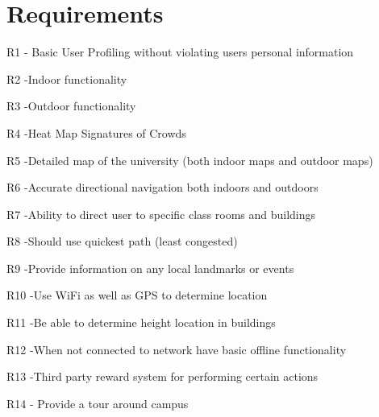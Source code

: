 \documentclass[11pt]{article}
\begin{document}
\section{Requirements}

R1 - Basic User Profiling without violating users personal information

R2 -Indoor functionality

R3 -Outdoor functionality

R4 -Heat Map Signatures of Crowds

R5 -Detailed map of the university (both indoor maps and outdoor maps)

R6 -Accurate directional navigation both indoors and outdoors

R7 -Ability to direct user to specific class rooms and buildings

R8 -Should use quickest path (least congested)

R9 -Provide information on any local landmarks or events 

R10 -Use WiFi as well as GPS to determine location 

R11 -Be able to determine height location in buildings

R12 -When not connected to network have basic offline functionality 

R13 -Third party reward system for performing certain actions

R14 - Provide a tour around campus 
\end{document}
